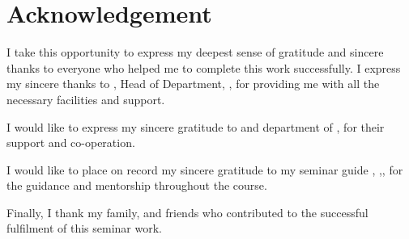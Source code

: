 \chapter*{\centering Acknowledgement}%
%


I take this opportunity to express my deepest sense of gratitude and sincere
thanks to everyone who helped me to complete this work successfully. I express
my sincere thanks to \textbf{ \hod}, Head of Department, \dept,
\college\hspace*{2pt} \collegeplace \hspace*{2pt} for providing me with all the
necessary facilities and support.

I would like to express my sincere gratitude to \textbf{\semcordinatorA} and
\textbf{\semcordinatorB}  department of
\hspace*{2pt} \dept, \hspace*{2pt} \college \hspace*{2pt} \collegeplace
\hspace*{2pt} for their support and co-operation. %

I would like to place on record my sincere gratitude to my seminar guide
\textbf{\guide},
\hspace*{2pt}\guidedes,\hspace*{2pt}\dept,\hspace*{2pt}\college
\hspace*{2pt}\collegeplace \hspace*{2pt} for the guidance and mentorship
throughout the course.

Finally, I thank my family, and friends who contributed to the successful
fulfilment of this seminar work.

\vspace*{30pt}
\begin{flushright}
    \textbf{\author}
\end{flushright}
\thispagestyle{plain}